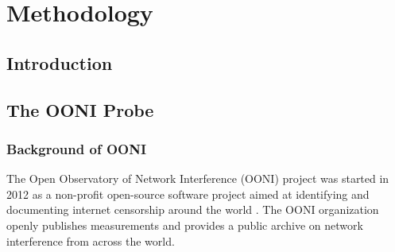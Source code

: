 \chapter{Methodology}
\section{Introduction}

\section{The OONI Probe}

\subsection{Background of OONI}

The Open Observatory of Network Interference (OONI) project was started in 2012 as a non-profit open-source software project aimed at identifying and documenting internet censorship around the world \cite{}. The OONI organization openly publishes measurements and provides a public archive on network interference from across the world. 

